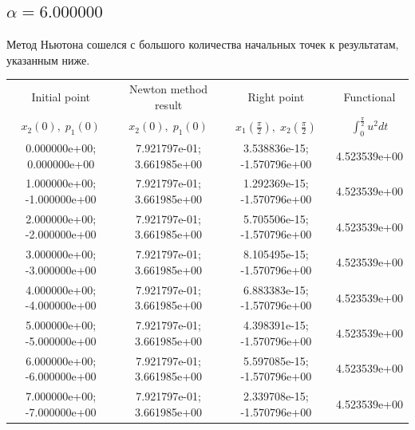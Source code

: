 \documentclass[titlepage]{article}
\def\l{\left}
\def\r{\right}
\begin{document}
\subsection{$\alpha = 6.000000$} 
Метод Ньютона сошелся с большого количества начальных точек к результатам, указанным ниже. \\ 
\begin{tabular}{ | c | c | c | c |} 
\hline 
Initial point  & Newton method result & Right point & Functional 
 \\ $x_2(0), \; p_1(0)$ & $x_2(0), \; p_1(0)$ & $x_1\l(\frac{\pi}{2}\r), \; x_2\l(\frac{\pi}{2}\r)$ & $\int_{0}^{\frac{\pi}{2}}u^2dt$  \\ \hline 
0.000000e+00; 0.000000e+00 & 7.921797e-01; 3.661985e+00 & 3.538836e-15; -1.570796e+00 & 4.523539e+00 \\ \hline 
1.000000e+00; -1.000000e+00 & 7.921797e-01; 3.661985e+00 & 1.292369e-15; -1.570796e+00 & 4.523539e+00 \\ \hline 
2.000000e+00; -2.000000e+00 & 7.921797e-01; 3.661985e+00 & 5.705506e-15; -1.570796e+00 & 4.523539e+00 \\ \hline 
3.000000e+00; -3.000000e+00 & 7.921797e-01; 3.661985e+00 & 8.105495e-15; -1.570796e+00 & 4.523539e+00 \\ \hline 
4.000000e+00; -4.000000e+00 & 7.921797e-01; 3.661985e+00 & 6.883383e-15; -1.570796e+00 & 4.523539e+00 \\ \hline 
5.000000e+00; -5.000000e+00 & 7.921797e-01; 3.661985e+00 & 4.398391e-15; -1.570796e+00 & 4.523539e+00 \\ \hline 
6.000000e+00; -6.000000e+00 & 7.921797e-01; 3.661985e+00 & 5.597085e-15; -1.570796e+00 & 4.523539e+00 \\ \hline 
7.000000e+00; -7.000000e+00 & 7.921797e-01; 3.661985e+00 & 2.339708e-15; -1.570796e+00 & 4.523539e+00 \\ \hline 
\end{tabular} 
\end{document}
